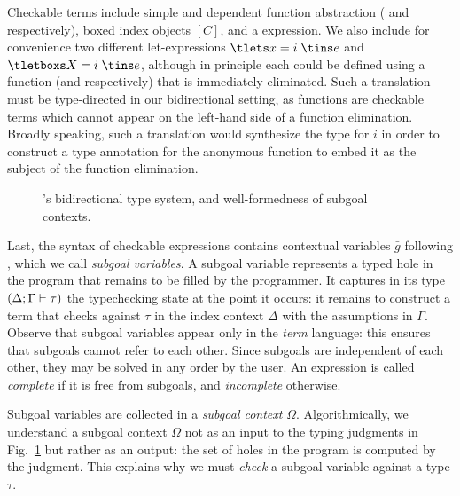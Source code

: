 Checkable terms include simple and dependent function abstraction (\tfn{} and
\tmlam{} respectively), boxed index objects $[C]$, and a \tcases expression.
We also include for convenience two different let-expressions
$\tlets x = i\;\tins e$ and $\tletboxs X = i\;\tins e$,
although in principle each could be defined using a function (\tfns and \tmlams
respectively) that is immediately eliminated.
Such a translation must be type-directed in our bidirectional setting, as
functions are checkable terms which cannot appear on the left-hand side of a
function elimination.
Broadly speaking, such a translation would synthesize the type for $i$ in order
to construct a type annotation for the anonymous function to embed it as the
subject of the function elimination.

\begin{figure}[tp]
  
  \caption{\Beluga's bidirectional type system, and well-formedness of subgoal contexts.}
  \label{fig:beluga-types}
\end{figure}

Last, the syntax of checkable expressions contains contextual variables $\bar g$
following \cite{Nanevski:ICML05,Boespflug:LFMTP11}, which we call
\emph{subgoal variables}.
A subgoal variable represents a typed hole in the program that remains to be
filled by the programmer.
It captures in its type $(\Delta; \Gamma \vdash \tau)$ the typechecking state at the point it occurs:
it remains to construct a term that checks against $\tau$ in the index context
$\Delta$ with the assumptions in $\Gamma$.
Observe that subgoal variables appear only in the \emph{term} language: this
ensures that subgoals cannot refer to each other.
Since subgoals are independent of each other, they may be solved in any order by
the user.
An expression is called \emph{complete} if it is free from subgoals, and
\emph{incomplete} otherwise.

Subgoal variables are collected in a \emph{subgoal context} $\Omega$.
Algorithmically, we understand a subgoal context $\Omega$ not as an input to the
typing judgments in Fig.~\ref{fig:beluga-types} but rather as an output: the set
of holes in the program is computed by the judgment.
This explains why we must \emph{check} a subgoal variable against a type $\tau$.

